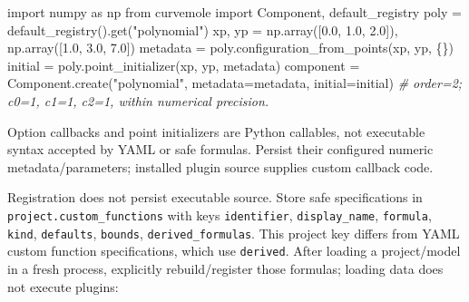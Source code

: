 \documentclass[
  10pt,
  a4paper,
  oneside]{scrreprt}
\newenvironment{Shaded}{}{}
\newcommand{\CommentTok}[1]{\textcolor[rgb]{0.38,0.63,0.69}{\textit{#1}}}
\newcommand{\FloatTok}[1]{\textcolor[rgb]{0.25,0.63,0.44}{#1}}
\newcommand{\ImportTok}[1]{#1}
\newcommand{\NormalTok}[1]{#1}
\newcommand{\OperatorTok}[1]{\textcolor[rgb]{0.40,0.40,0.40}{#1}}
\newcommand{\StringTok}[1]{\textcolor[rgb]{0.25,0.44,0.63}{#1}}
\begin{document}
\begin{Shaded}
\begin{Highlighting}[]
\ImportTok{import}\NormalTok{ numpy }\ImportTok{as}\NormalTok{ np}
\ImportTok{from}\NormalTok{ curvemole }\ImportTok{import}\NormalTok{ Component, default\_registry}
\NormalTok{poly }\OperatorTok{=}\NormalTok{ default\_registry().get(}\StringTok{"polynomial"}\NormalTok{)}
\NormalTok{xp, yp }\OperatorTok{=}\NormalTok{ np.array([}\FloatTok{0.0}\NormalTok{, }\FloatTok{1.0}\NormalTok{, }\FloatTok{2.0}\NormalTok{]), np.array([}\FloatTok{1.0}\NormalTok{, }\FloatTok{3.0}\NormalTok{, }\FloatTok{7.0}\NormalTok{])}
\NormalTok{metadata }\OperatorTok{=}\NormalTok{ poly.configuration\_from\_points(xp, yp, \{\})}
\NormalTok{initial }\OperatorTok{=}\NormalTok{ poly.point\_initializer(xp, yp, metadata)}
\NormalTok{component }\OperatorTok{=}\NormalTok{ Component.create(}\StringTok{"polynomial"}\NormalTok{, metadata}\OperatorTok{=}\NormalTok{metadata, initial}\OperatorTok{=}\NormalTok{initial)}
\CommentTok{\# order=2; c0=1, c1=1, c2=1, within numerical precision.}
\end{Highlighting}
\end{Shaded}

Option callbacks and point initializers are Python callables, not
executable syntax accepted by YAML or safe formulas. Persist their
configured numeric metadata/parameters; installed plugin source supplies
custom callback code.

Registration does not persist executable source. Store safe
specifications in \texttt{project.custom\_functions} with keys
\texttt{identifier}, \texttt{display\_name}, \texttt{formula},
\texttt{kind}, \texttt{defaults}, \texttt{bounds},
\texttt{derived\_formulas}. This project key differs from YAML custom
function specifications, which use \texttt{derived}. After loading a
project/model in a fresh process, explicitly rebuild/register those
formulas; loading data does not execute plugins:
\end{document}

